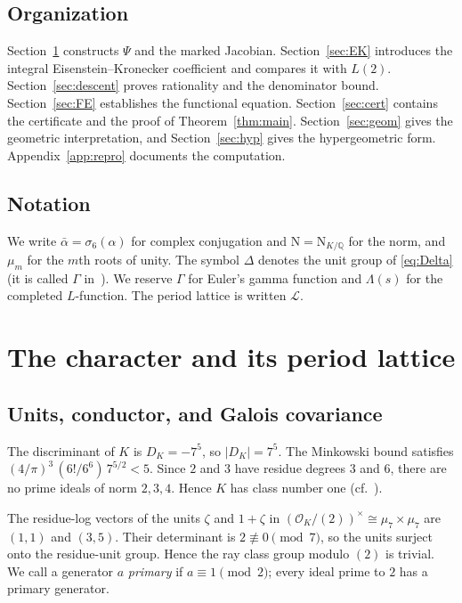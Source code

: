 \documentclass[11pt]{amsart}
\theoremstyle{remark}
\theoremstyle{definition}
\newcommand{\Q}{\mathbb{Q}}
\newcommand{\OK}{\mathcal{O}_K}
\newcommand{\Nm}{\mathrm{N}}
\newcommand{\Lat}{\mathcal{L}}
\begin{document}
\subsection{Organization}
Section~\ref{sec:char} constructs $\Psi$ and the marked Jacobian. Section~\ref{sec:EK} introduces the integral Eisenstein--Kronecker coefficient and compares it with $L(2)$. Section~\ref{sec:descent} proves rationality and the denominator bound. Section~\ref{sec:FE} establishes the functional equation. Section~\ref{sec:cert} contains the certificate and the proof of Theorem~\ref{thm:main}. Section~\ref{sec:geom} gives the geometric interpretation, and Section~\ref{sec:hyp} gives the hypergeometric form. Appendix~\ref{app:repro} documents the computation.

\subsection*{Notation}
We write $\bar\alpha=\sigma_6(\alpha)$ for complex conjugation and $\Nm=\Nm_{K/\Q}$ for the norm, and $\mu_m$ for the $m$th roots of unity. The symbol $\Delta$ denotes the unit group of \eqref{eq:Delta} (it is called $\Gamma$ in~\cite{KS}). We reserve $\Gamma$ for Euler's gamma function and $\Lambda(s)$ for the completed $L$-function. The period lattice is written $\Lat$.

\section{The character and its period lattice}\label{sec:char}

\subsection{Units, conductor, and Galois covariance}
The discriminant of $K$ is $D_K=-7^5$, so $|D_K|=7^5$. The Minkowski bound satisfies $(4/\pi)^3\,(6!/6^6)\,7^{5/2}<5$. Since $2$ and $3$ have residue degrees $3$ and $6$, there are no prime ideals of norm $2,3,4$. Hence $K$ has class number one (cf.~\cite[\S11]{Washington}).

The residue-log vectors of the units $\zeta$ and $1+\zeta$ in $(\OK/(2))^\times\cong\mu_7\times\mu_7$ are $(1,1)$ and $(3,5)$. Their determinant is $2\not\equiv0\pmod 7$, so the units surject onto the residue-unit group. Hence the ray class group modulo $(2)$ is trivial. We call a generator $a$ \emph{primary} if $a\equiv1\pmod 2$; every ideal prime to $2$ has a primary generator.
\end{document}
